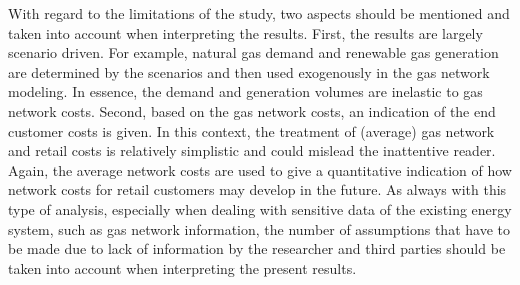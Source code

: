 With regard to the limitations of the study, two aspects should be mentioned and taken into account when interpreting the results. First, the results are largely scenario driven. For example, natural gas demand and renewable gas generation are determined by the scenarios and then used exogenously in the gas network modeling. In essence, the demand and generation volumes are inelastic to gas network costs. Second, based on the gas network costs, an indication of the end customer costs is given. In this context, the treatment of (average) gas network and retail costs is relatively simplistic and could mislead the inattentive reader. Again, the average network costs are used to give a quantitative indication of how network costs for retail customers may develop in the future. As always with this type of analysis, especially when dealing with sensitive data of the existing energy system, such as gas network information, the number of assumptions that have to be made due to lack of information by the researcher and third parties should be taken into account when interpreting the present results. 






























